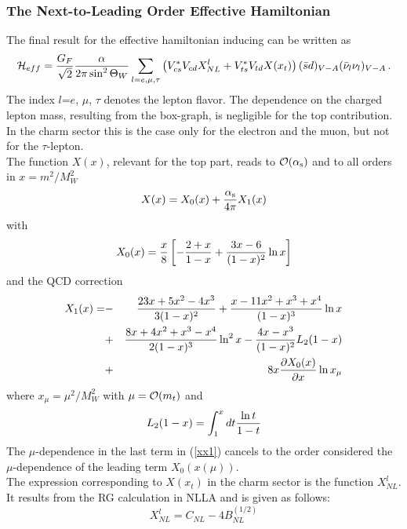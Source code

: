 \subsubsection{The Next-to-Leading Order Effective Hamiltonian}
               \label{sec:HeffRareKB:kpnn:heff}
The final result for the effective hamiltonian inducing \kpnn can
be written as
\begin{equation}\label{hkpn} {\cal H}_{eff}={G_F \over{\sqrt 2}}{\alpha\over 2\pi \sin^2\Theta_W}
 \sum_{l=e,\mu,\tau}\left( V^{\ast}_{cs}V_{cd} X^l_{NL}+
V^{\ast}_{ts}V_{td} X(x_t)\right)
 (\bar sd)_{V-A}(\bar\nu_l\nu_l)_{V-A} \, .
\end{equation}
The index $l$=$e$, $\mu$, $\tau$ denotes the lepton flavor.
The dependence on the charged lepton mass, resulting from the box-graph,
is negligible for the top contribution. In the charm sector this is the
case only for the electron and the muon, but not for the $\tau$-lepton.
\\
The function $X(x)$, relevant for the top part, reads
to ${\cal O}(\alpha_{\rm s})$ and to all orders in $x=m^2/M^2_W$
\begin{equation}\label{xx} X(x)=X_0(x)+\frac{\alpha_{\rm s}}{4 \pi} X_1(x) \end{equation}
with \cite{inamilim:81}
\begin{equation}\label{xx0} X_0(x)={x\over 8}\left[ -{2+x\over 1-x}+{3x-6\over (1-x)^2}\ln x\right] \end{equation}
and the QCD correction \cite{buchallaburas:93b}
\begin{eqnarray}\label{xx1}
X_1(x)=&-&{23x+5x^2-4x^3\over 3(1-x)^2}+{x-11x^2+x^3+x^4\over (1-x)^3}\ln x
\nonumber\\
&+&{8x+4x^2+x^3-x^4\over 2(1-x)^3}\ln^2 x-{4x-x^3\over (1-x)^2}L_2(1-x)
\nonumber\\
&+&8x{\partial X_0(x)\over\partial x}\ln x_\mu
\end{eqnarray}
where $x_\mu=\mu^2/M^2_W$ with $\mu={\cal O}(m_t)$ and
\begin{equation}\label{l2} L_2(1-x)=\int^x_1 dt {\ln t\over 1-t}   \end{equation}
The $\mu$-dependence in the last term in (\ref{xx1}) cancels to the
order considered the $\mu$-dependence of the leading term $X_0(x(\mu))$.
\\
The expression corresponding to $X(x_t)$ in the charm sector is the function
$X^l_{NL}$. It results from the RG calculation in NLLA and is given
as follows:
\begin{equation}\label{xlnl}X^l_{NL}=C_{NL}-4 B^{(1/2)}_{NL}  \end{equation}
